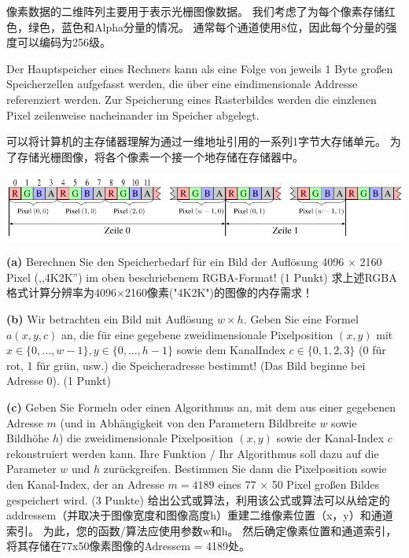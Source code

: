 \documentclass[fleqn]{article}
\begin{document}
像素数据的二维阵列主要用于表示光栅图像数据。 我们考虑了为每个像素存储红色，绿色，蓝色和Alpha分量的情况。 通常每个通道使用8位，因此每个分量的强度可以编码为256级。

Der Hauptspeicher eines Rechners kann als eine Folge von jeweils 1 Byte großen Speicherzellen aufgefasst werden, die über eine eindimensionale Addresse referenziert werden. Zur Speicherung eines Rasterbildes werden die einzlenen Pixel zeilenweise nacheinander im Speicher abgelegt.

可以将计算机的主存储器理解为通过一维地址引用的一系列1字节大存储单元。 为了存储光栅图像，将各个像素一个接一个地存储在存储器中。

\begin{center}
    \includegraphics[scale=0.4]{9.png}
\end{center}

\indent\textbf{(a)} Berechnen Sie den Speicherbedarf für ein Bild der Auflösung 4096 $\times$ 2160 Pixel (,,4K2K'') im oben beschriebenem RGBA-Format! (1 Punkt) 求上述RGBA格式计算分辨率为4096$\times$2160像素("4K2K")的图像的内存需求！

\indent\textbf{(b)} Wir betrachten ein Bild mit Auflösung $w\times h$. Geben Sie eine Formel $a(x, y, c)$ an, die für eine gegebene zweidimensionale Pixelposition $(x, y)$ mit $x\in \{0, . . . , w − 1\}, y \in \{0, . . . , h − 1\} $ sowie dem KanalIndex $c \in \{0, 1, 2, 3\}$ (0 für rot, 1 für grün, usw.) die Speicheradresse bestimmt! (Das Bild beginne bei Adresse 0). (1 Punkt)

\indent\textbf{(c)} Geben Sie Formeln oder einen Algorithmus an, mit dem aus einer gegebenen Adresse $m$ (und in Abhängigkeit von den Parametern Bildbreite $w$ sowie Bildhöhe $h$) die zweidimensionale Pixelposition $(x, y)$ sowie der Kanal-Index $c$ rekonstruiert werden kann. Ihre Funktion / Ihr Algorithmus soll dazu auf die Parameter $w$ und $h$ zurückgreifen. Bestimmen Sie dann die Pixelposition sowie den Kanal-Index, der an Adresse $m = 4189$ eines 77 $\times$ 50 Pixel großen Bildes gespeichert wird. (3 Punkte)
给出公式或算法，利用该公式或算法可以从给定的addressem（并取决于图像宽度和图像高度h）重建二维像素位置（x，y）和通道索引。 为此，您的函数/算法应使用参数w和h。 然后确定像素位置和通道索引，将其存储在77x50像素图像的Adressem = 4189处。
\end{document}
